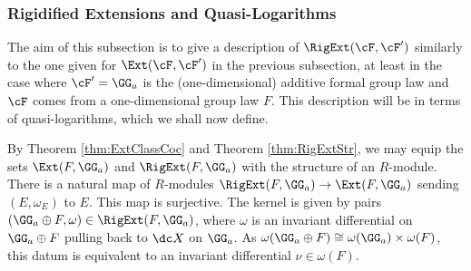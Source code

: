 \subsubsection{Rigidified Extensions and Quasi-Logarithms} %
The aim of this subsection is to give a description of $\RigExt(\cF, \cF')$ 
similarly to the one given for $\Ext(\cF, \cF')$ in the previous 
subsection, at least in the case where $\cF' = \GG_a$ is the (one-dimensional)
additive formal group law and $\cF$ comes from a one-dimensional group law $F$. 
This description will be in terms of quasi-logarithms, which we shall now
define.


By Theorem \ref{thm:ExtClassCoc} and Theorem \ref{thm:RigExtStr}, we may equip the 
sets $\Ext(F, \GG_a)$ and $\RigExt(F, \GG_a)$ with the structure of an $R$-module. 
There is a natural map of $R$-modules $\RigExt(F, \GG_a) \to \Ext(F, \GG_a)$
sending $(E, \omega_E)$ to $E$. This map is surjective. The kernel is given by
pairs $(\GG_a \oplus F, \omega) \in \RigExt(F, \GG_a)$, where $\omega$ is an
invariant differential on
$\GG_a \oplus F$ pulling back to $\dc X$ on $\GG_a$. As $\omega(\GG_a \oplus F)
\cong \omega(\GG_a) \times \omega(F)$, this datum is equivalent to an invariant
differential $\nu \in \omega(F)$. 



